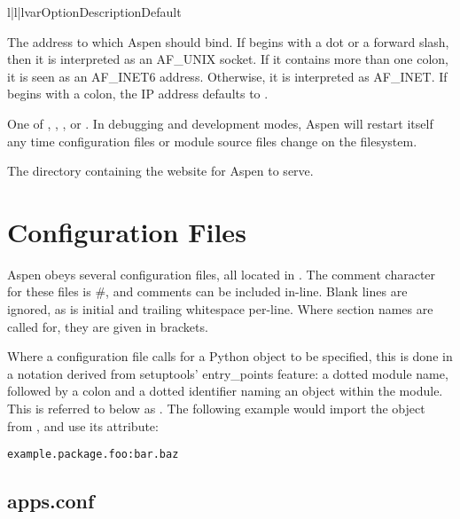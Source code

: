 \begin{tableiii}{l|l|l}{var}{Option}{Description}{Default}

    {The address to which Aspen should bind. If  begins with a dot
    or a forward slash, then it is interpreted as an AF_UNIX socket. If it
    contains more than one colon, it is seen as an AF_INET6 address. Otherwise,
    it is interpreted as AF_INET. If  begins with a colon, the IP
    address defaults to .} {}

    {One of , , , or
    . In debugging and development modes, Aspen will restart
    itself any time configuration files or module source files change on the
    filesystem.}
    {}

    {The directory containing the website for Aspen to serve.}
    {}

\end{tableiii}


\section{Configuration Files \label{config-files}}

Aspen obeys several configuration files, all located in . The
comment character for these files is \#, and comments can be included in-line.
Blank lines are ignored, as is initial and trailing whitespace per-line. Where
section names are called for, they are given in brackets.

Where a configuration file calls for a Python object to be specified, this is
done in a notation derived from setuptools' entry_points feature: a dotted
module name, followed by a colon and a dotted identifier naming an object within
the module. This is referred to below as . The following
example would import the  object from , and
use its  attribute:

\begin{verbatim}
example.package.foo:bar.baz
\end{verbatim}




\subsection{apps.conf}
\label{apps-conf}

